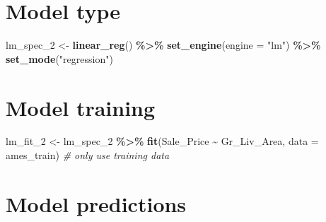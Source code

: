 \documentclass[
]{book}
\newenvironment{Shaded}{\begin{snugshade}}{\end{snugshade}}
\newcommand{\CommentTok}[1]{\textcolor[rgb]{0.56,0.35,0.01}{\textit{#1}}}
\newcommand{\DataTypeTok}[1]{\textcolor[rgb]{0.13,0.29,0.53}{#1}}
\newcommand{\DecValTok}[1]{\textcolor[rgb]{0.00,0.00,0.81}{#1}}
\newcommand{\KeywordTok}[1]{\textcolor[rgb]{0.13,0.29,0.53}{\textbf{#1}}}
\newcommand{\NormalTok}[1]{#1}
\newcommand{\OperatorTok}[1]{\textcolor[rgb]{0.81,0.36,0.00}{\textbf{#1}}}
\newcommand{\StringTok}[1]{\textcolor[rgb]{0.31,0.60,0.02}{#1}}
\begin{document}
\hypertarget{model-type-1}{%
\section{Model type}\label{model-type-1}}

\begin{Shaded}
\begin{Highlighting}[]
\NormalTok{lm\_spec\_}\DecValTok{2}\NormalTok{ \textless{}{-}}
\StringTok{  }\KeywordTok{linear\_reg}\NormalTok{() }\OperatorTok{\%\textgreater{}\%}\StringTok{  }
\StringTok{  }\KeywordTok{set\_engine}\NormalTok{(}\DataTypeTok{engine =} \StringTok{"lm"}\NormalTok{) }\OperatorTok{\%\textgreater{}\%}\StringTok{  }
\StringTok{  }\KeywordTok{set\_mode}\NormalTok{(}\StringTok{"regression"}\NormalTok{) }
\end{Highlighting}
\end{Shaded}

\hypertarget{model-training-1}{%
\section{Model training}\label{model-training-1}}

\begin{Shaded}
\begin{Highlighting}[]
\NormalTok{lm\_fit\_}\DecValTok{2}\NormalTok{ \textless{}{-}}\StringTok{ }
\StringTok{  }\NormalTok{lm\_spec\_}\DecValTok{2} \OperatorTok{\%\textgreater{}\%}\StringTok{ }
\StringTok{  }\KeywordTok{fit}\NormalTok{(Sale\_Price }\OperatorTok{\textasciitilde{}}\StringTok{ }\NormalTok{Gr\_Liv\_Area,}
      \DataTypeTok{data =}\NormalTok{ ames\_train) }\CommentTok{\# only use training data}
\end{Highlighting}
\end{Shaded}

\hypertarget{model-predictions-1}{%
\section{Model predictions}\label{model-predictions-1}}

\begin{Shaded}
\end{Shaded}
\end{document}
